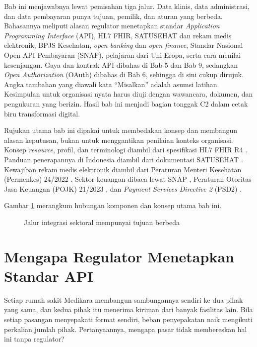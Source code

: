 Bab ini menjawabnya lewat pemisahan tiga jalur. Data klinis, data administrasi, dan data pembayaran punya tujuan,
pemilik, dan aturan yang berbeda. Bahasannya meliputi alasan regulator menetapkan standar \textit{Application
Programming Interface} (API), HL7 FHIR, SATUSEHAT dan rekam medis elektronik, BPJS Kesehatan, \textit{open banking}
dan \textit{open finance}, Standar Nasional Open API Pembayaran (SNAP), pelajaran dari Uni Eropa, serta cara menilai
kesenjangan. Gaya dan kontrak API dibahas di Bab 5 dan Bab 9, sedangkan \textit{Open Authorization} (OAuth) dibahas di
Bab 6, sehingga di sini cukup dirujuk. Angka tambahan yang diawali kata ``Misalkan'' adalah asumsi latihan. Kesimpulan
untuk organisasi nyata harus diuji dengan wawancara, dokumen, dan pengukuran yang berizin. Hasil bab ini menjadi
bagian tonggak C2 dalam cetak biru transformasi digital.

Rujukan utama bab ini dipakai untuk membedakan konsep dan membangun alasan keputusan, bukan untuk menggantikan
penilaian konteks organisasi. Konsep \textit{resource}, profil, dan terminologi diambil dari spesifikasi HL7 FHIR R4
\cite{fhir-r4}. Panduan penerapannya di Indonesia diambil dari dokumentasi SATUSEHAT \cite{satusehat}. Kewajiban rekam
medis elektronik diambil dari Peraturan Menteri Kesehatan (Permenkes) 24/2022 \cite{permenkes24-2022}. Sektor keuangan
dibaca lewat SNAP \cite{snap-bi}, Peraturan Otoritas Jasa Keuangan (POJK) 21/2023 \cite{pojk21-2023}, dan
\textit{Payment Services Directive 2} (PSD2) \cite{c07-psd2}.

Gambar \ref{fig:ch07-ilustrasi-bab} merangkum hubungan komponen dan konsep utama bab ini.
\begin{figure}[!htb]
  \centering
  
  \caption{Jalur integrasi sektoral mempunyai tujuan berbeda}
  \label{fig:ch07-ilustrasi-bab}
\end{figure}

\section{Mengapa Regulator Menetapkan Standar API}

Setiap rumah sakit Medikara membangun sambungannya sendiri ke dua pihak yang sama, dan kedua pihak itu menerima
kiriman dari banyak fasilitas lain. Bila setiap pasangan menyepakati format sendiri, beban penyepakatan naik mengikuti
perkalian jumlah pihak. Pertanyaannya, mengapa pasar tidak membereskan hal ini tanpa regulator?

